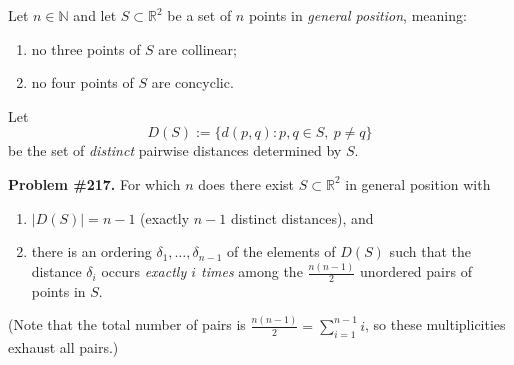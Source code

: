 Let $n\in\mathbb{N}$ and let $S\subset\mathbb{R}^2$ be a set of $n$ points in \emph{general position}, meaning:
\begin{enumerate}
  \item no three points of $S$ are collinear;
  \item no four points of $S$ are concyclic.
\end{enumerate}
Let
\[D(S):=\{d(p,q): p,q\in S,\ p\neq q\}\]
be the set of \emph{distinct} pairwise distances determined by $S$.

\noindent\textbf{Problem \#217.}
For which $n$ does there exist $S\subset\mathbb{R}^2$ in general position with
\begin{enumerate}
  \item $|D(S)|=n-1$ (exactly $n-1$ distinct distances), and
  \item there is an ordering $\delta_1,\dots,\delta_{n-1}$ of the elements of $D(S)$ such that the distance $\delta_i$ occurs \emph{exactly $i$ times} among the $\frac{n(n-1)}{2}$ unordered pairs of points in $S$.
\end{enumerate}
(Note that the total number of pairs is $\frac{n(n-1)}{2}=\sum_{i=1}^{n-1} i$, so these multiplicities exhaust all pairs.)
